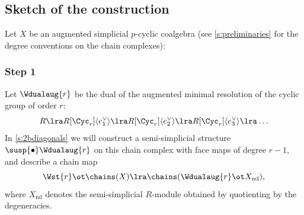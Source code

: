 %
%
%
%
%
%

\subsection*{Sketch of the construction} Let $X$ be an augmented simplicial $p$-cyclic coalgebra (see \cref{s:preliminaries} for the degree conventions on the chain complexes): 
\subsubsection*{Step 1} Let $\Wdualaug{r}$ be the dual of the augmented minimal resolution of the cyclic group of order $r$:
	\[
		R \lra R[\Cyc_r]\langle e_1^{\vee}\rangle \lra R[\Cyc_r]\langle e_2^{\vee}\rangle 
		\lra R[\Cyc_r]\langle e_3^{\vee}\rangle \lra \ldots
	\]
In \cref{s:2bdiagonals} we will construct a semi-simplicial structure $\susp{\bullet} \Wdualaug{r}$ on this chain complex with face maps of degree $r-1$, and describe a chain map
\begin{equation}\label{eq:uno}
	\Wst{r}\ot \chains(X) \lra \chains(\Wdualaug{r}\ot X_{\mathrm{nd}}),
\end{equation}
where $X_{\mathrm{nd}}$ denotes the semi-simplicial $R$-module obtained by quotienting by the degeneracies.
